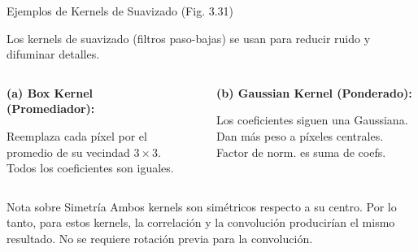 \documentclass[10pt]{beamer}
\begin{document}
\begin{frame}[fragile]{Ejemplos de Kernels de Suavizado (Fig. 3.31)}
{\footnotesize
Los kernels de suavizado (filtros paso-bajas) se usan para reducir ruido y difuminar detalles.
\begin{columns}[T]
\begin{column}{0.48\textwidth}
\textbf{(a) Box Kernel (Promediador):}
\begin{center}
\end{center}
\tiny Reemplaza cada píxel por el promedio de su vecindad $3 \times 3$. Todos los coeficientes son iguales.
\end{column}
\begin{column}{0.04\textwidth} \end{column} %
\begin{column}{0.48\textwidth}
\textbf{(b) Gaussian Kernel (Ponderado):}
\begin{center}
\end{center}
\tiny Los coeficientes siguen una Gaussiana. Dan más peso a píxeles centrales. Factor de norm. es suma de coefs.
\end{column}
\end{columns}
\vspace{0.1cm}
\begin{block}{\tiny Nota sobre Simetría} %
\tiny Ambos kernels son simétricos respecto a su centro. Por lo tanto, para estos kernels, la correlación y la convolución producirían el mismo resultado. No se requiere rotación previa para la convolución.
\end{block}
}
\end{frame}
\end{document}

